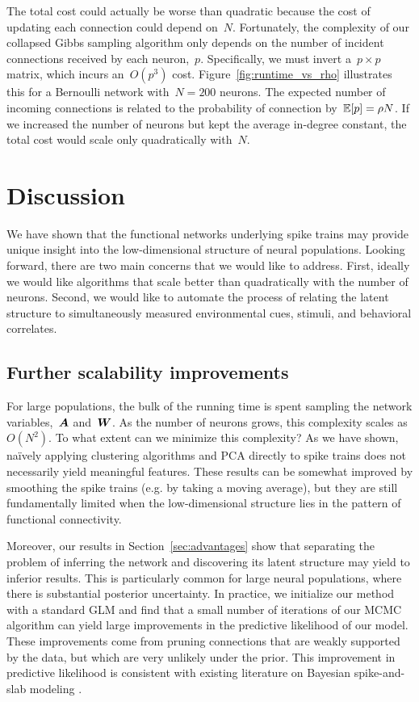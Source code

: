 The total cost could actually be worse than quadratic because the cost
of updating each connection could depend on~$N$. Fortunately, the
complexity of our collapsed Gibbs sampling algorithm only depends on
the number of incident connections received by each neuron,~$p$.
Specifically, we must invert a~$p \times p$ matrix, which incurs
an~$O(p^3)$ cost. Figure~\ref{fig:runtime_vs_rho} illustrates this for
a Bernoulli network with~$N=200$ neurons. The expected number of
incoming connections is related to the probability of connection
by~$\mathbb{E}[p]=\rho N$. If we increased the number of neurons but kept
the average in-degree constant, the total cost would scale only
quadratically with~$N$.



\section{Discussion}
\label{sec:discussion}
We have shown that the functional networks underlying
spike trains may provide unique insight into the low-dimensional
structure of neural populations. Looking forward, there are 
two main concerns that we would like to address.
First, ideally we would like algorithms that scale better 
than quadratically with the number of neurons. Second, we 
would like to automate the process of relating the latent 
structure to simultaneously measured environmental cues, stimuli, 
and behavioral correlates. 

\subsection{Further scalability improvements}
For large populations, the bulk of the running time is spent 
sampling the network variables,~$\boldsymbol{A}$ and~$\boldsymbol{W}$. As the number of
neurons grows, this complexity scales as~$O(N^2)$. To
what extent can we minimize this complexity? As we have shown,
na\"ively applying clustering algorithms and PCA directly
to spike trains does not necessarily yield meaningful features. These
results can be somewhat improved by smoothing the spike
trains (e.g. by taking a moving average), but they are still
fundamentally limited when the low-dimensional structure
lies in the pattern of functional connectivity.

Moreover, our results in Section~\ref{sec:advantages} show that 
separating the problem of inferring the network and discovering 
its latent structure may yield to inferior results. This is 
particularly common for large neural populations, where there is 
substantial posterior uncertainty. 
In practice, we initialize our method with a standard GLM and
find that a small number of iterations of our MCMC algorithm
can yield large improvements in the predictive likelihood of our
model. These improvements come from pruning connections that are
weakly supported by the data, but which are very unlikely under the
prior. This improvement in predictive likelihood is consistent with
existing literature on Bayesian spike-and-slab modeling \citep{Mohamed-2012}.

